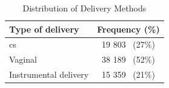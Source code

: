 \begin{table}[htbp]
  \centering
  \caption{Distribution of Delivery Methods}
  \label{tab:delivery_methods}
  \renewcommand{\arraystretch}{1.5} %
  \setlength{\tabcolsep}{12pt} %
  \begin{tabular}{lc}
    \hline
    \textbf{Type of delivery} & \textbf{Frequency (\%)} \\
\hline
    \ac{cs} & 19 803 \, (27\%) \\

    Vaginal & 38 189 \, (52\%) \\

    Instrumental delivery & 15 359 \, (21\%) \\
    \hline
  \end{tabular}
\end{table}



